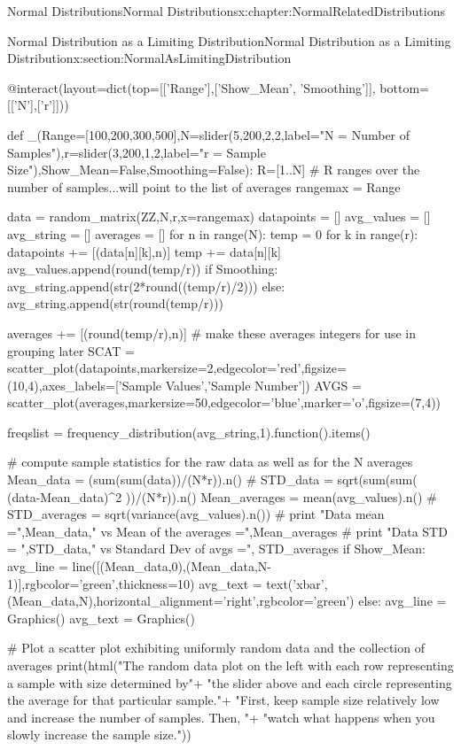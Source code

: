 \documentclass[oneside,10pt,]{book}
\numberwithin{equation}{section}
\begin{document}
\begin{chapterptx}{Normal Distributions}{}{Normal Distributions}{}{}{x:chapter:NormalRelatedDistributions}
\begin{sectionptx}{Normal Distribution as a Limiting Distribution}{}{Normal Distribution as a Limiting Distribution}{}{}{x:section:NormalAsLimitingDistribution}
\begin{sageinput}
@interact(layout=dict(top=[['Range'],['Show_Mean', 'Smoothing']],  
bottom=[['N'],['r']]))

def _(Range=[100,200,300,500],N=slider(5,200,2,2,label="N = Number of Samples"),r=slider(3,200,1,2,label="r = Sample Size"),Show_Mean=False,Smoothing=False):
    R=[1..N]     #  R ranges over the number of samples...will point to the list of averages
    rangemax = Range

    data = random_matrix(ZZ,N,r,x=rangemax)
    datapoints = []
    avg_values = []
    avg_string = []
    averages = []
    for n in range(N):
        temp = 0
        for k in range(r):
            datapoints += [(data[n][k],n)]
            temp += data[n][k]
        avg_values.append(round(temp/r))
        if Smoothing:
            avg_string.append(str(2*round((temp/r)/2)))    
        else:
            avg_string.append(str(round(temp/r)))
            
        averages += [(round(temp/r),n)]   #  make these averages integers for use in grouping later
    SCAT = scatter_plot(datapoints,markersize=2,edgecolor='red',figsize=(10,4),axes_labels=['Sample Values','Sample Number'])
    AVGS = scatter_plot(averages,markersize=50,edgecolor='blue',marker='o',figsize=(7,4))
    
    freqslist = frequency_distribution(avg_string,1).function().items()
       
       
# compute sample statistics for the raw data as well as for the N averages
    Mean_data = (sum(sum(data))/(N*r)).n()
#    STD_data = sqrt(sum(sum( (data-Mean_data)^2 ))/(N*r)).n()
    Mean_averages = mean(avg_values).n()
#    STD_averages = sqrt(variance(avg_values).n())
#    print "Data mean =",Mean_data," vs Mean of the averages =",Mean_averages
#    print "Data STD = ",STD_data," vs Standard Dev of avgs =", STD_averages
    if Show_Mean:
        avg_line = line([(Mean_data,0),(Mean_data,N-1)],rgbcolor='green',thickness=10)
        avg_text = text('xbar',(Mean_data,N),horizontal_alignment='right',rgbcolor='green')
    else:
        avg_line = Graphics()
        avg_text = Graphics()
            
#  Plot a scatter plot exhibiting uniformly random data and the collection of averages 
    print(html("The random data plot on the left with each row representing a sample with size determined by\n"+
         "the slider above and each circle representing the average for that particular sample.\n"+
         "First, keep sample size relatively low and increase the number of samples.  Then, \n"+
         "watch what happens when you slowly increase the sample size."))


\end{sageinput}
\end{sectionptx}
\end{chapterptx}
\end{document}
